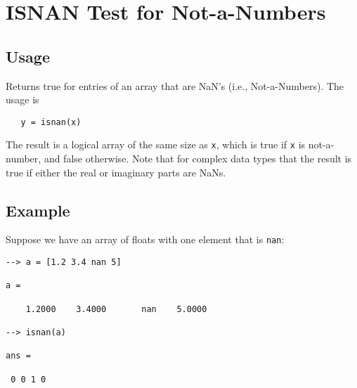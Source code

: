 \section{ISNAN Test for Not-a-Numbers}

\subsection{Usage}

Returns true for entries of an array that are NaN's (i.e.,
Not-a-Numbers).  The usage is
\begin{verbatim}
   y = isnan(x)
\end{verbatim}
The result is a logical array of the same size as \verb|x|,
which is true if \verb|x| is not-a-number, and false otherwise.
Note that for complex data types that
the result is true if either the real or imaginary parts
are NaNs.
\subsection{Example}

Suppose we have an array of floats with one element that
is \verb|nan|:
\begin{verbatim}
--> a = [1.2 3.4 nan 5]

a = 

    1.2000    3.4000       nan    5.0000 

--> isnan(a)

ans = 

 0 0 1 0 
\end{verbatim}

